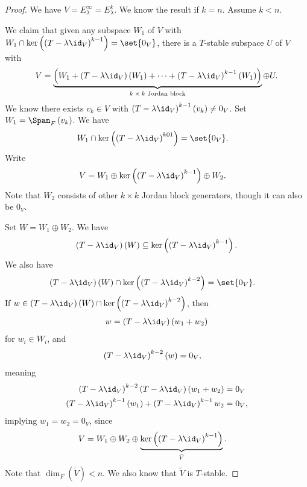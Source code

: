 \documentclass[10pt]{mypackage}
\begin{document}
\begin{proof}
  We have $V = E_{\lambda}^{\infty} = E_{\lambda}^{k}$. We know the result if $k = n$. Assume $k < n$.\newline

  We claim that given any subspace $W_1$ of $V$ with $W_1\cap \ker\left(\left(T-\lambda\id_{V}\right)^{k-1}\right) = \set{0_V}$, there is a $T$-stable subspace $U$ of $V$ with 
  \begin{align*}
    V =\underbrace{\left( W_1 + \left(T-\lambda\id_V\right)\left(W_1\right) + \cdots + \left(T-\lambda\id_V\right)^{k-1}(W_1)\right)}_{\text{$k\times k$ Jordan block}}\oplus U.
  \end{align*}
  We know there exists $v_k\in V$ with $\left(T-\lambda\id_V\right)^{k-1}\left(v_k\right) \neq 0_V$. Set $W_1 = \Span_{F}\left(v_k\right)$. We have
  \begin{align*}
    W_1\cap \ker\left(\left(T-\lambda\id_V\right)^{k01}\right) &= \set{0_V}.
  \end{align*}
  Write
  \begin{align*}
    V &= W_1\oplus \ker\left(\left(T-\lambda\id_V\right)^{k-1}\right)\oplus W_2.
  \end{align*}
  Note that $W_2$ consists of other $k\times k$ Jordan block generators, though it can also be $0_V$.\newline

  Set $W = W_1\oplus W_2$. We have 
  \begin{align*}
    \left(T-\lambda\id_V\right)(W)\subseteq \ker\left(\left(T-\lambda\id_V\right)^{k-1}\right).
  \end{align*}
  We also have
  \begin{align*}
    \left(T-\lambda\id_V\right)\left(W\right)\cap \ker\left(\left(T-\lambda\id_V\right)^{k-2}\right) &= \set{0_V}.
  \end{align*}
  If $w\in \left(T-\lambda\id_V\right)\left(W\right)\cap \ker\left(\left(T-\lambda\id_V\right)^{k-2}\right)$, then
  \begin{align*}
    w = \left(T-\lambda\id_V\right)\left(w_1 + w_2\right)
  \end{align*}
  for $w_i\in W_i$, and
  \begin{align*}
    \left(T-\lambda\id_V\right)^{k-2}\left(w\right) &= 0_V,
  \end{align*}
  meaning
  \begin{align*}
    \left(T-\lambda\id_V\right)^{k-2}\left(T-\lambda\id_V\right)\left(w_1 + w_2\right) &= 0_V\\
    \left(T-\lambda\id_V\right)^{k-1}\left(w_1\right) + \left(T-\lambda\id_V\right)^{k-1}w_2 &= 0_V,
  \end{align*}
  implying $w_1 = w_2 = 0_V$, since
  \begin{align*}
    V &= W_1 \oplus W_2 \oplus \underbrace{\ker\left(\left(T-\lambda\id_V\right)^{k-1}\right)}_{\tilde{V}}.
  \end{align*}
  Note that $\dim_{F}\left(\tilde{V}\right) < n$. We also know that $\tilde{V}$ is $T$-stable.\newline


\end{proof}
\end{document}
